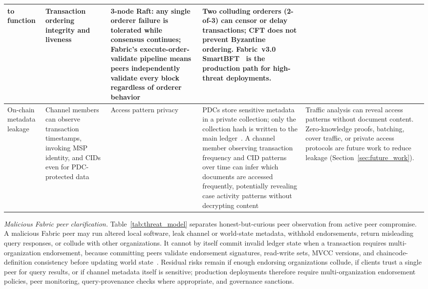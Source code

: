 \documentclass[preprint,12pt]{elsarticle}
\begin{document}
\begin{xltabular}{\textwidth}{|p{2.2cm}|X|p{2.0cm}|X|X|}
to function &
Transaction ordering integrity and liveness &
3-node Raft: any single orderer failure is tolerated while consensus
continues; Fabric's execute-order-validate pipeline means peers
independently validate every block regardless of orderer
behavior~\cite{androulaki2018hyperledger,
hyperledgerFabricOrderingService_v24} &
Two colluding orderers (2-of-3) can censor or delay transactions; CFT
does not prevent Byzantine ordering. Fabric~v3.0
SmartBFT~\cite{fabricWhatsNew3x,fabricOrderingServiceLatest} is the
production path for high-threat deployments. \\
\hline
On-chain metadata leakage &
Channel members can observe transaction timestamps, invoking MSP
identity, and CIDs even for PDC-protected data &
Access pattern privacy &
PDCs store sensitive metadata in a private collection; only the
collection hash is written to the main ledger~\cite{fabricPDCDoc}.
A channel member observing transaction frequency and CID patterns
over time can infer which documents are accessed frequently,
potentially revealing case activity patterns without decrypting
content &
Traffic analysis can reveal access patterns without document content.
Zero-knowledge proofs, batching, cover traffic, or private access
protocols are future work to reduce leakage
(Section~\ref{sec:future_work}). \\
\hline
\end{xltabular}
\par\vspace{3pt}
\begin{minipage}{\textwidth}
\raggedright\scriptsize
\smallskip
\noindent\textit{Malicious Fabric peer clarification.}
Table~\ref{tab:threat_model} separates honest-but-curious peer observation
from active peer compromise. A malicious Fabric peer may run altered local
software, leak channel or world-state metadata, withhold endorsements, return
misleading query responses, or collude with other organizations. It cannot by
itself commit invalid ledger state when a transaction requires
multi-organization endorsement, because committing peers validate endorsement
signatures, read-write sets, MVCC versions, and chaincode-definition
consistency before updating world state~\cite{androulaki2018hyperledger,
hyperledgerFabricOrderingService_v24}. Residual risks remain if enough
endorsing organizations collude, if clients trust a single peer for query
results, or if channel metadata itself is sensitive; production deployments
therefore require multi-organization endorsement policies, peer monitoring,
query-provenance checks where appropriate, and governance sanctions.
\end{minipage}
\endgroup
\end{document}
